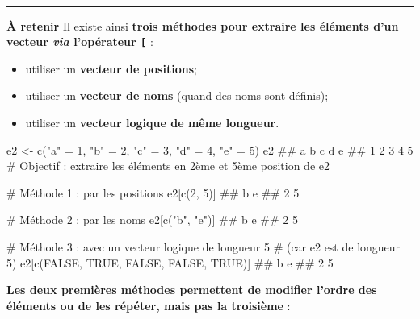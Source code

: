 \documentclass[12pt,twosided, notitlepage]{book}
\newenvironment{Shaded}{}{}
\newcommand{\CommentTok}[1]{\textcolor[rgb]{0.00,0.50,0.00}{#1}}
\newcommand{\DecValTok}[1]{#1}
\newcommand{\KeywordTok}[1]{\textcolor[rgb]{0.00,0.00,1.00}{#1}}
\newcommand{\NormalTok}[1]{#1}
\newcommand{\OtherTok}[1]{\textcolor[rgb]{1.00,0.25,0.00}{#1}}
\newcommand{\StringTok}[1]{\textcolor[rgb]{0.00,0.50,0.50}{#1}}
\providecommand{\tightlist}{%
  \setlength{\itemsep}{0pt}\setlength{\parskip}{0pt}}
\renewenvironment{Shaded}{\begin{snugshade}}{\end{snugshade}}
\begin{document}
~

\begin{center}\rule{0.5\linewidth}{\linethickness}\end{center}

\textbf{À retenir} Il existe ainsi \textbf{trois méthodes pour extraire
les éléments d'un vecteur \emph{via} l'opérateur
\texttt{{[}}}\index{\texttt{[}} :

\begin{itemize}
\tightlist
\item
  utiliser un \textbf{vecteur de positions};
\item
  utiliser un \textbf{vecteur de noms} (quand des noms sont définis);
\item
  utiliser un \textbf{vecteur logique de même longueur}.
\end{itemize}

\begin{Shaded}
\begin{Highlighting}[]
\NormalTok{e2 <-}\StringTok{ }\KeywordTok{c}\NormalTok{(}\StringTok{"a"}\NormalTok{ =}\StringTok{ }\DecValTok{1}\NormalTok{, }\StringTok{"b"}\NormalTok{ =}\StringTok{ }\DecValTok{2}\NormalTok{, }\StringTok{"c"}\NormalTok{ =}\StringTok{ }\DecValTok{3}\NormalTok{, }\StringTok{"d"}\NormalTok{ =}\StringTok{ }\DecValTok{4}\NormalTok{, }\StringTok{"e"}\NormalTok{ =}\StringTok{ }\DecValTok{5}\NormalTok{)}
\NormalTok{e2}
\NormalTok{  ## a b c d e }
\NormalTok{  ## 1 2 3 4 5}
\CommentTok{# Objectif : extraire les éléments en 2ème et 5ème position de e2}

\CommentTok{# Méthode 1 : par les positions}
\NormalTok{e2[}\KeywordTok{c}\NormalTok{(}\DecValTok{2}\NormalTok{, }\DecValTok{5}\NormalTok{)]}
\NormalTok{  ## b e }
\NormalTok{  ## 2 5}

\CommentTok{# Méthode 2 : par les noms}
\NormalTok{e2[}\KeywordTok{c}\NormalTok{(}\StringTok{"b"}\NormalTok{, }\StringTok{"e"}\NormalTok{)]}
\NormalTok{  ## b e }
\NormalTok{  ## 2 5}

\CommentTok{# Méthode 3 : avec un vecteur logique de longueur 5}
\CommentTok{# (car e2 est de longueur 5)}
\NormalTok{e2[}\KeywordTok{c}\NormalTok{(}\OtherTok{FALSE}\NormalTok{, }\OtherTok{TRUE}\NormalTok{, }\OtherTok{FALSE}\NormalTok{, }\OtherTok{FALSE}\NormalTok{, }\OtherTok{TRUE}\NormalTok{)]}
\NormalTok{  ## b e }
\NormalTok{  ## 2 5}
\end{Highlighting}
\end{Shaded}

\textbf{Les deux premières méthodes permettent de modifier l'ordre des
éléments ou de les répéter, mais pas la troisième} :
\end{document}
